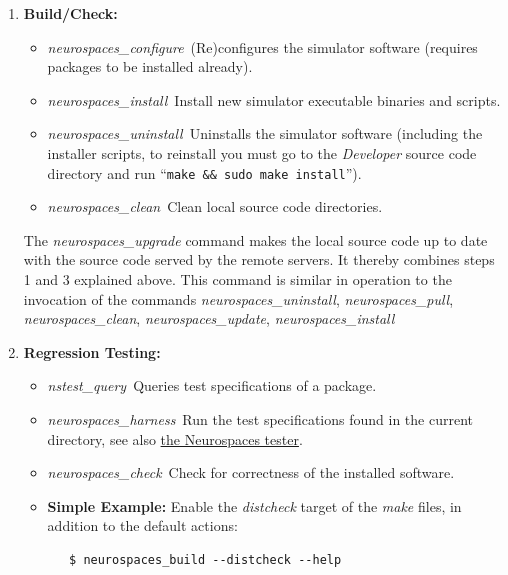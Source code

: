 \documentclass[12pt]{article}
\begin{document}
\begin{enumerate}
   \item{\bf Build/Check:}
   \begin{itemize}
      \item {\it neurospaces\_configure}\,\,\,(Re)configures the simulator software (requires packages to be installed already).
      \item {\it neurospaces\_install}\,\,\,Install new simulator executable binaries and scripts.
      \item {\it neurospaces\_uninstall}\,\,\,Uninstalls the simulator software (including the installer scripts, to reinstall you must go to the {\it Developer} source code directory and run ``{\tt make \&\& sudo make install}'').
      \item {\it neurospaces\_clean}\,\,\,Clean local source code directories. 
   \end{itemize}
  
   The {\it neurospaces\_upgrade} command makes the local source code
   up to date with the source code served by the remote servers.  It
   thereby combines steps 1 and 3 explained above.  This command is
   similar in operation to the invocation of the commands {\it
     neurospaces\_uninstall}, {\it neurospaces\_pull}, {\it
     neurospaces\_clean}, {\it neurospaces\_update}, {\it
     neurospaces\_install}

   \item {\bf Regression Testing:}
   \begin{itemize}
      \item {\it nstest\_query}\,\,\,Queries test specifications of a package.
      \item {\it neurospaces\_harness}\,\,\,Run the test specifications found in the current directory, see also \href{../neurospaces-tester/neurospaces-tester.tex}{the Neurospaces tester}.
      \item {\it neurospaces\_check}\,\,\,Check for correctness of the installed software.
      \item{\bf Simple Example:} Enable the {\it distcheck} target of the {\it make} files, in addition to the default actions:
      \begin{verbatim}
   $ neurospaces_build --distcheck --help
      \end{verbatim}
   \end{itemize}
 

\end{enumerate}
\end{document}

